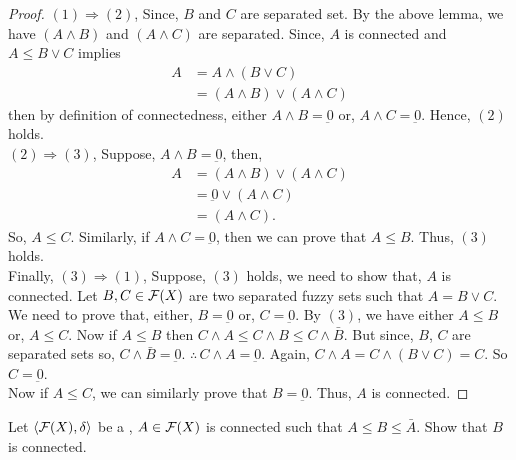 \documentclass[../main-sheet.tex]{subfiles}
\begin{document}
\begin{proof}
    \((1)\Rightarrow(2)\), Since, \(B\) and \(C\) are separated set. By the above lemma, we have \((A\wedge B)\) and \((A\wedge C)\) are separated. Since, \(A\) is connected and \(A\leq B\vee C\) implies
    \begin{align*}
        A&=A\wedge (B\vee C)\\
        &=(A\wedge B)\vee(A\wedge C)
    \end{align*}
    then by definition of connectedness, either \(A\wedge B=\underbar{0}\) or, \(A\wedge C=\underbar{0}\). Hence, \((2)\) holds.\\

    \((2)\Rightarrow(3)\), Suppose, \(A\wedge B=\underbar{0}\), then,
    \begin{align*}
        A&=(A\wedge B)\vee (A\wedge C)\\
        &=\underbar{0} \vee (A\wedge C)\\
        &=(A\wedge C).
    \end{align*}
    So, \(A\leq C\). Similarly, if \(A\wedge C=\underbar{0}\), then we can prove that \(A\leq B\). Thus, \((3)\) holds.\\

    Finally, \((3)\Rightarrow(1)\), Suppose, \((3)\) holds, we need to show that, \(A\) is connected. Let \(B,C\in\mathcal{F}(X)\) are two separated fuzzy sets such that \(A=B\vee C\).\\
    We need to prove that, either, \(B=\underbar{0}\) or, \(C=\underbar{0}\). By \((3)\), we have either \(A\leq B\) or, \(A\leq C\). Now if \(A\leq B\) then \(C\wedge A\leq C\wedge B\leq C\wedge\bar{B}\). But since, \(B\), \(C \) are separated sets so, \(C\wedge \bar{B }=\underbar{0}\). \(\therefore\,C\wedge A=\underbar{0}\). Again, \(C\wedge A=C\wedge(B\vee C)=C\). So \(C=\underbar{0}\).\\
    Now if \(A\leq C \), we can similarly prove that \(B=\underbar{0}\). Thus, \(A \) is connected.
\end{proof}
\begin{thm}
    Let \(\langle \mathcal{F}(X), \delta \rangle\) be a \fts, \(A\in\mathcal{F}(X)\) is connected such that \(A\leq B\leq\bar{A}\). Show that \(B \) is connected.
\end{thm}
\end{document}
